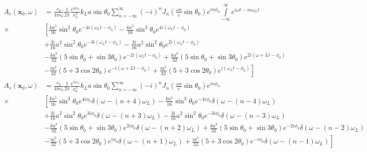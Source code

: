 \begin{align}
    A_r({\bm x}_0,\omega) & =\frac{e_0}{4\pi\epsilon_0}\frac1{2\pi}\frac{e^{ikx_0}}{x_0^3}k_La\sin\theta_0\sum_{n=-\infty}^{\infty} (-i)^n J_n(\frac{\omega a}c\sin\theta_0)e^{in\phi_0}\int\limits_{-\infty}^\infty e^{i\omega t-i n \omega_Lt}\nonumber \\
    \times                & \left[ \frac{ka^3}{16}\sin^3\theta_0e^{-4i(\omega_L t-\phi_0)}-\frac{ka^3}{16}\sin^3\theta_0e^{4i(\omega_L t-\phi_0)}\right.\nonumber                                                                                         \\
                          & +\frac{3i}{16}a^2\sin^2\theta_0e^{-3i(\omega_L t-\phi_0)}-\frac{3i}{16}a^2\sin^2\theta_0e^{2i(\omega_L t-\phi_0)}\nonumber                                                                                                    \\
                          & -\frac{ka^3}{32}(5\sin\theta_0+\sin3\theta_0)e^{-2i(\omega_L t-\phi_0)}+\frac{ka^3}{32}(5\sin\theta_0+\sin3\theta_0)e^{2i(\omega+L t-\phi_0)}\nonumber                                                                        \\
                          & \left.-\frac{ia^2}{32}(5+3\cos 2\theta_0)e^{-i(\omega+L t-\phi_0)}+\frac{ia^2}{32}(5+3\cos 2\theta_0)e^{i(\omega_L t-\phi_0)}\right]
\end{align}
\begin{align}
    A_r({\bm x}_0,\omega) & =\frac{e_0}{4\pi\epsilon_0}\frac1{2\pi}\frac{e^{ikx_0}}{x_0^3}k_La\sin\theta_0\sum_{n=-\infty}^{\infty} (-i)^n J_n(\frac{\omega a}c\sin\theta_0)e^{in\phi_0}\nonumber                \\
    \times                & \left[  \frac{ka^3}{16}\sin^3\theta_0e^{4i\phi_0}\delta(\omega-(n+4)\omega_L)-\frac{ka^3}{16}\sin^3\theta_0e^{-4i\phi_0}\delta(\omega-(n-4)\omega_L)\right.\nonumber                 \\
                          & +\frac{3i}{16}a^2\sin^2\theta_0e^{3i\phi_0}\delta(\omega-(n+3)\omega_L)-\frac{3i}{16}a^2\sin^2\theta_0e^{-3i\phi_0}\delta(\omega-(n-3)\omega_L)\nonumber                             \\
                          & -\frac{ka^3}{32}(5\sin\theta_0+\sin3\theta_0)e^{2i\phi_0}\delta(\omega-(n+2)\omega_L)+\frac{ka^3}{32}(5\sin\theta_0+\sin3\theta_0)e^{-2i\phi_0}\delta(\omega-(n-2)\omega_L)\nonumber \\
                          & \left.-\frac{ia^2}{32}(5+3\cos 2\theta_0)e^{i\phi_0}\delta(\omega-(n+1)\omega_L)+\frac{ia^2}{32}(5+3\cos 2\theta_0)e^{-i\phi_0}\delta(\omega-(n-1)\omega_L)\right]
\end{align}
